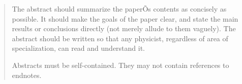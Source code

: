 \documentclass[aps,onecolumn,12pt,letterpaper,amsmath,amssymb,floatfix,pra]{revtex4-1}
\begin{document}


\begin{abstract}

The abstract should summarize the paperÕs contents as concisely as possible. It should make the goals of the paper clear, and state the main results or conclusions directly (not merely allude to them vaguely). The abstract should be written so that any physicist, regardless of area of specialization, can read and understand it.

Abstracts must be self-contained. They may not contain references to endnotes.

\end{abstract}

\maketitle


%
%

%
%
%
\end{document}
